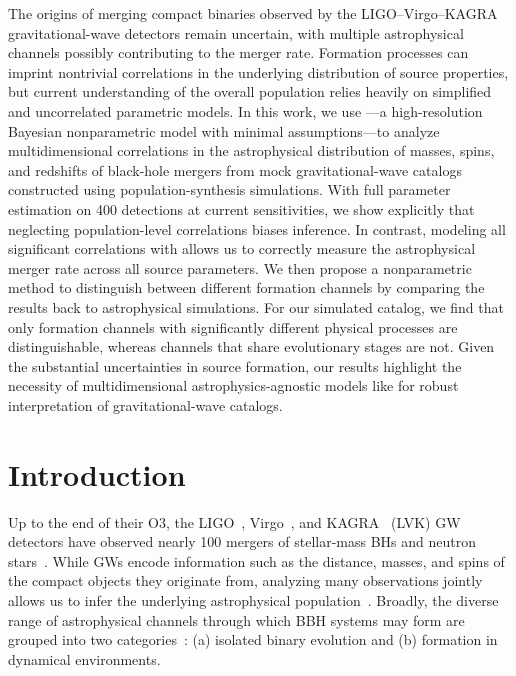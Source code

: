 \begin{refsection}
\begin{chapterabstract}
The origins of merging compact binaries observed by the LIGO--Virgo--KAGRA gravitational-wave detectors remain uncertain, with multiple astrophysical channels possibly contributing to the merger rate. Formation processes can imprint nontrivial correlations in the underlying distribution of source properties, but current understanding of the overall population relies heavily on simplified and uncorrelated parametric models. In this work, we use \PixelPop---a high-resolution Bayesian nonparametric model with minimal assumptions---to analyze multidimensional correlations in the astrophysical distribution of masses, spins, and redshifts of black-hole mergers from mock gravitational-wave catalogs constructed using population-synthesis simulations. With full parameter estimation on 400 detections at current sensitivities, we show explicitly that neglecting population-level correlations biases inference. In contrast, modeling all significant correlations with \PixelPop allows us to correctly measure the astrophysical merger rate across all source parameters. We then propose a nonparametric method to distinguish between different formation channels by comparing the \PixelPop results back to astrophysical simulations. For our simulated catalog, we find that only formation channels with significantly different physical processes are distinguishable, whereas channels that share evolutionary stages are not. Given the substantial uncertainties in source formation, our results highlight the necessity of multidimensional astrophysics-agnostic models like \PixelPop for robust interpretation of gravitational-wave catalogs.
\end{chapterabstract}

\section{Introduction}
\label{sec: nlth introduction}

Up to the end of their \ac{O3}, the LIGO~\citep{TheLIGOScientific:2014jea}, Virgo~\citep{TheVirgo:2014hva}, and KAGRA~\citep{KAGRA:2020tym} (\acs{LVK}) \acf{GW} detectors have observed nearly 100 mergers of stellar-mass \acp{BH} and neutron stars~\citep{KAGRA:2021vkt}. While \acp{GW} encode information such as the distance, masses, and spins of the compact objects they originate from, analyzing many observations jointly allows us to infer the underlying astrophysical population~\citep{Vitale:2020aaz,Thrane:2018qnx,Callister:2024cdx,LIGOScientific:2018jsj,LIGOScientific:2020kqk,KAGRA:2021duu}. Broadly, the diverse range of astrophysical channels through which \ac{BBH} systems may form are grouped into two categories~\citep{Mapelli:2020vfa,Ivanova:2012vx,Bavera:2020uch,Gerosa:2021mno,Mapelli:2019bnp,Mandel:2021smh}: (a) isolated binary evolution and (b) formation in dynamical environments.


\end{refsection}
